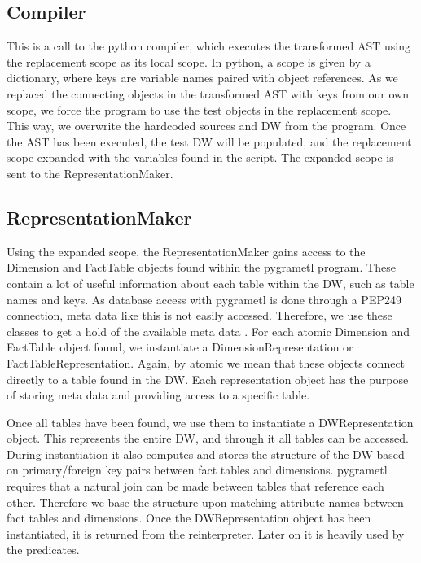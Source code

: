 \subsection{Compiler}
This is a call to the python compiler, which executes the transformed AST using the replacement scope as its local scope. In python, a scope is given by a dictionary, where keys are variable names paired with object references. As we replaced the connecting objects in the transformed AST with keys from our own scope, we force the program to use the test objects in the replacement scope. This way, we overwrite the hardcoded sources and DW from the program.  Once the AST has been executed, the test DW will be populated, and the replacement scope expanded with the variables found in the script. The expanded scope is sent to the RepresentationMaker. 


\subsection{RepresentationMaker} 
Using the expanded scope, the RepresentationMaker gains access to the Dimension and FactTable objects found within the pygrametl program. These contain a lot of useful information about each table within the DW, such as table names and keys. As database access with pygrametl is done through a PEP249 connection, meta data like this is not easily accessed. Therefore, we use these classes to get a hold of the available meta data . For each atomic Dimension and FactTable object found, we instantiate a DimensionRepresentation or FactTableRepresentation. Again, by atomic we mean that these objects connect directly to a table found in the DW. Each representation object has the purpose of storing meta data and providing access to a specific table. 

Once all tables have been found, we use them to instantiate a DWRepresentation object. This represents the entire DW, and through it all tables can be accessed. During instantiation it also computes and stores the structure of the DW based on primary/foreign key pairs between fact tables and dimensions.  pygrametl requires that a natural join can be made between tables that reference each other. Therefore we base the structure upon matching attribute names between fact tables and dimensions. Once the DWRepresentation object has been instantiated, it is returned from the reinterpreter. Later on it is heavily used by the predicates.